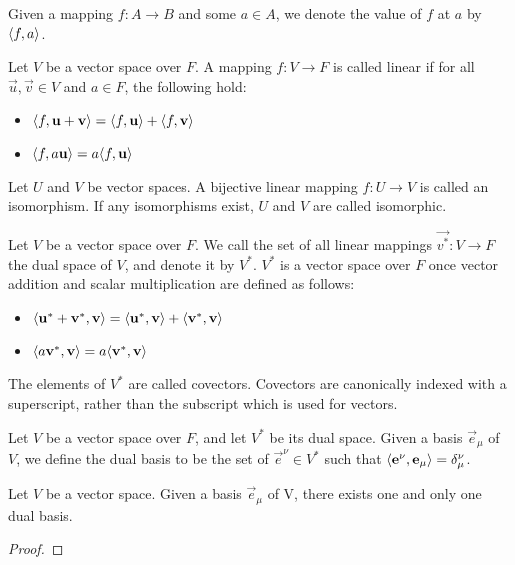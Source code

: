 \documentclass[../main.tex]{subfiles}
\begin{document}
    \begin{notation}[Mappings]
        Given a mapping \(f:A\to{}B\) and some \(a\in{}A\), we denote the value of \(f\) at \(a\) by \(\langle f,a\rangle\).
    \end{notation}
    \begin{definition}
        Let \(V\) be a vector space over \(F\). A mapping \(f:V\to{}F\) is called linear if for all \(\vec{u},\vec{v}\in{}V\) and \(a\in{}F\), the following hold:
        \begin{itemize}
            \item\(\langle f,\mathbf{u}+\mathbf{v}\rangle=\langle f,\mathbf{u}\rangle+\langle f,\mathbf{v}\rangle\)
            \item\(\langle f,a\mathbf{u}\rangle=a\langle f,\mathbf{u}\rangle\)
        \end{itemize}
    \end{definition}
    \begin{definition}[Isomorphism]
        Let \(U\) and \(V\) be vector spaces. A bijective linear mapping \(f:U\to{}V\) is called an isomorphism. If any isomorphisms exist, \(U\) and \(V\) are called isomorphic.
    \end{definition}
    \begin{definition}
        Let \(V\) be a vector space over \(F\). We call the set of all linear mappings \(\vec{v^{*}}:V\to{}F\) the dual space of \(V\), and denote it by \(V^{*}\). \(V^{*}\) is a vector space over \(F\) once vector addition and scalar multiplication are defined as follows:
        \begin{itemize}
            \item\(\langle\mathbf{u}^{*}+\mathbf{v}^{*},\mathbf{v}\rangle=\langle\mathbf{u}^{*},\mathbf{v}\rangle+\langle\mathbf{v}^{*},\mathbf{v}\rangle\)
            \item\(\langle a\mathbf{v}^{*},\mathbf{v}\rangle=a\langle\mathbf{v}^{*},\mathbf{v}\rangle\)
        \end{itemize}
        The elements of \(V^{*}\) are called covectors. Covectors are canonically indexed with a superscript, rather than the subscript which is used for vectors.
    \end{definition}
    \begin{definition}
        Let \(V\) be a vector space over \(F\), and let \(V^{*}\) be its dual space. Given a basis \(\vec{e}_{\mu}\) of \(V\), we define the dual basis to be the set of \(\vec{e}^{\nu}\in{}V^{*}\) such that \(\langle\mathbf{e}^{\nu},\mathbf{e}_{\mu}\rangle=\delta^{\nu}_{\mu}\).
    \end{definition}
    \begin{theorem}
        Let \(V\) be a vector space. Given a basis \(\vec{e}_{\mu}\) of V, there exists one and only one dual basis.
        \begin{proof}
        \end{proof}
    \end{theorem}
\end{document}
